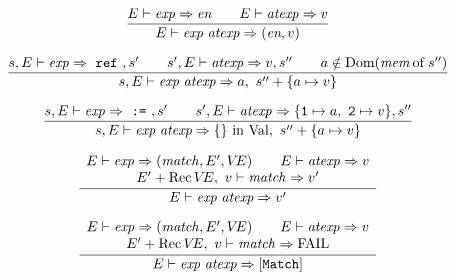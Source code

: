 \begin{equation}        %
\frac{\E\ts\exp\ra\e\qquad\E\ts\atexp\ra\V}
     {\E\ts\appexp\ra(\e,\V)}
\end{equation}

\begin{equation}	%
\label{refapp-dyn-rule}
\frac{\s,\E\ts\exp\ra~\ml{ref}~,\s'\qquad
      \s',\E\ts\atexp\ra\V,\s''\qquad
      \A\notin\Dom(\of{\mem}{\s''})}
     {\s,\E\ts\appexp\ra\A,\ \s''+\{\A\mapsto\V\} }
\end{equation}


\begin{equation}	%
\label{assapp-dyn-rule}
\frac{\s,\E\ts\exp\ra~\mbox{\tt :=}~,\s'\qquad
      \s',\E\ts\atexp\ra\{{\tt 1}\mapsto\A,\ {\tt 2}\mapsto\V\},\s''}
     {\s,\E\ts\appexp\ra\emptymap\ \In\ \Val,\ \s''+\{\A\mapsto\V\} }
\end{equation}
\oldpagebreak
{}

\begin{equation}	%
\label{closapp-dyn-rule}
\frac{\begin{array}{c}
      \E\ts\exp\ra(\match,\E',\VE)\qquad\E\ts\atexp\ra\V\\
      \E'+\Rec\VE,\ \V\ts\match\ra\V'
      \end{array}
     }
     {\E\ts\appexp\ra\V'}
\end{equation}

\begin{equation}        %
\label{closapp-dyn-rule1}
\frac{\begin{array}{c}
      \E\ts\exp\ra(\match,\E',\VE)\qquad\E\ts\atexp\ra\V\\
      \E'+\Rec\VE,\ \V\ts\match\ra\FAIL
      \end{array}
     }
     {\E\ts\appexp\ra[{\tt Match}]}
\end{equation}



